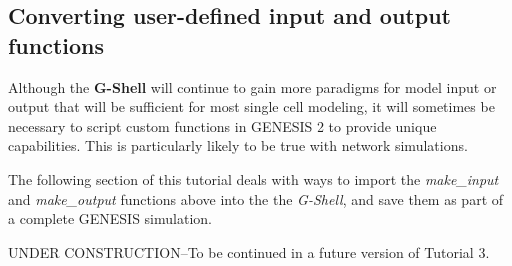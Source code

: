 \documentclass[12pt]{article}
\begin{document}
\subsection*{Converting user-defined input and output functions}

Although the {\bf G-Shell} will continue to gain more paradigms for model
input or output that will be sufficient for most single cell modeling,
it will sometimes be necessary to script custom functions in GENESIS 2
to provide unique capabilities.  This is particularly likely to be
true with network simulations.

The following section of this tutorial deals with ways to import the {\it make\_input} and
{\it make\_output} functions above into the the {\it G-Shell}, and save them as part
of a complete GENESIS simulation.

\noindent UNDER CONSTRUCTION--To be continued in a future version of Tutorial 3.



\end{document}
